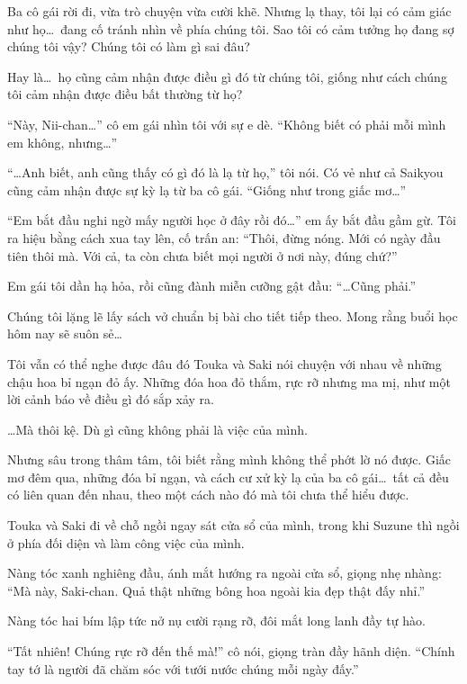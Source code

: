 \documentclass[../main.tex]{subfiles}
\begin{document}
Ba cô gái rời đi, vừa trò chuyện vừa cười khẽ. Nhưng lạ thay, tôi lại có cảm giác như họ\dots\ đang cố tránh nhìn về phía chúng tôi. Sao tôi có cảm tưởng họ đang sợ chúng tôi vậy? Chúng tôi có làm gì sai đâu?

Hay là\dots\ họ cũng cảm nhận được điều gì đó từ chúng tôi, giống như cách chúng tôi cảm nhận được điều bất thường từ họ?

``Này, Nii-chan\dots'' cô em gái nhìn tôi với sự e dè. ``Không biết có phải mỗi mình em không, nhưng\dots''

``\dots Anh biết, anh cũng thấy có gì đó là lạ từ họ,'' tôi nói. Có vẻ như cả Saikyou cũng cảm nhận được sự kỳ lạ từ ba cô gái. ``Giống như trong giấc mơ\dots''

``Em bắt đầu nghi ngờ mấy người học ở đây rồi đó\dots'' em ấy bắt đầu gầm gừ. Tôi ra hiệu bằng cách xua tay lên, cố trấn an: ``Thôi, đừng nóng. Mới có ngày đầu tiên thôi mà. Với cả, ta còn chưa biết mọi người ở nơi này, đúng chứ?''

Em gái tôi dần hạ hỏa, rồi cũng đành miễn cưỡng gật đầu: ``\dots Cũng phải.''

Chúng tôi lặng lẽ lấy sách vở chuẩn bị bài cho tiết tiếp theo. Mong rằng buổi học hôm nay sẽ suôn sẻ\dots

Tôi vẫn có thể nghe được đâu đó Touka và Saki nói chuyện với nhau về những chậu hoa bỉ ngạn đỏ ấy. Những đóa hoa đỏ thắm, rực rỡ nhưng ma mị, như một lời cảnh báo về điều gì đó sắp xảy ra.

\dots Mà thôi kệ. Dù gì cũng không phải là việc của mình.

Nhưng sâu trong thâm tâm, tôi biết rằng mình không thể phớt lờ nó được. Giấc mơ đêm qua, những đóa bỉ ngạn, và cách cư xử kỳ lạ của ba cô gái\dots\ tất cả đều có liên quan đến nhau, theo một cách nào đó mà tôi chưa thể hiểu được.

\pov{-}

Touka và Saki đi về chỗ ngồi ngay sát cửa sổ của mình, trong khi Suzune thì ngồi ở phía đối diện và làm công việc của mình.

Nàng tóc xanh nghiêng đầu, ánh mắt hướng ra ngoài cửa sổ, giọng nhẹ nhàng: ``Mà này, Saki-chan. Quả thật những bông hoa ngoài kia đẹp thật đấy nhỉ.''

Nàng tóc hai bím lập tức nở nụ cười rạng rỡ, đôi mắt long lanh đầy tự hào.

``Tất nhiên! Chúng rực rỡ đến thế mà!'' cô nói, giọng tràn đầy hãnh diện. ``Chính tay tớ là người đã chăm sóc với tưới nước chúng mỗi ngày đấy.''
\end{document}
